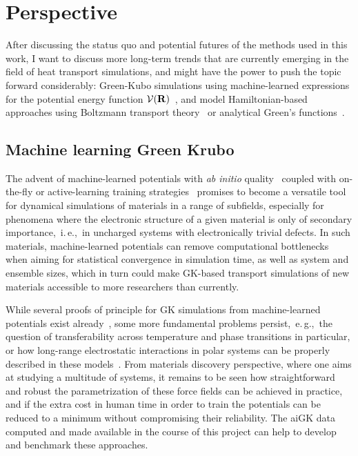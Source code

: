 \section{Perspective}
After discussing the status quo and potential futures of the methods used in this work, I want to discuss more long-term trends that are currently emerging in the field of heat transport simulations, and might have the power to push the topic forward considerably:
Green-Kubo simulations using machine-learned expressions for the potential energy function $\mathcal{V} ({\bf R})$~\cite{Korotaev2019,Li2020,Mangold2020}, and model Hamiltonian-based approaches using Boltzmann transport theory~\cite{Simoncelli2019} or analytical Green's functions~\cite{Isaeva2019,dangic2021}.

\subsection{Machine learning Green Krubo}
\label{sec:outlook.ml}
The advent of machine-learned potentials with \emph{ab initio} quality~\cite{Lorenz2004,Behler2007,Bartok2010,Bartok2013,shapeev2016} coupled with on-the-fly or active-learning training strategies~\cite{Li2015,Jinnouchi2019,podryabinkin2017,Liu2021} promises to become a versatile tool for dynamical simulations of materials in a range of subfields, especially for phenomena where the electronic structure of a given material is only of secondary importance,~i.\,e.,~in uncharged systems with electronically trivial defects. In such materials, machine-learned potentials can remove computational bottlenecks when aiming for statistical convergence in simulation time, as well as system and ensemble sizes, which in turn could make GK-based transport simulations of new materials accessible to more researchers than currently.

While several proofs of principle for GK simulations from machine-learned potentials exist already~\cite{Korotaev2019,Li2020,Mangold2020}, some more fundamental problems persist,~e.\,g.,~the question of transferability across temperature and phase transitions in particular, or how long-range electrostatic interactions in polar systems can be properly described in these models~\cite{Artrith2011,Grisafi2019,yue2021,kovacs2021}. From materials discovery perspective, where one aims at studying a multitude of systems, it remains to be seen how straightforward and robust the parametrization of these force fields can be achieved in practice, and if the extra cost in human time in order to train the potentials can be reduced to a minimum without compromising their reliability. The aiGK data computed and made available in the course of this project can help to develop and benchmark these approaches.


